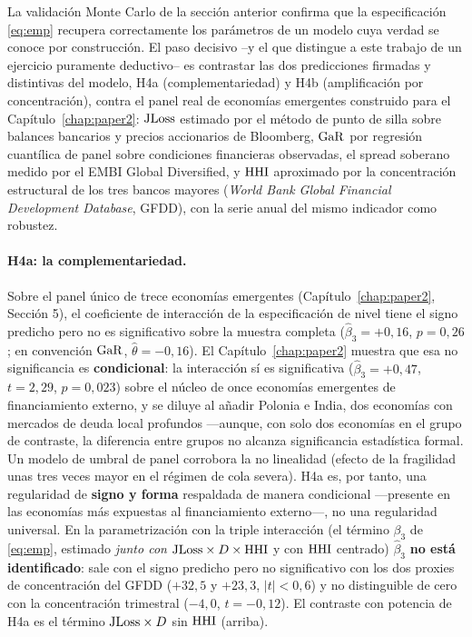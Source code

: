 La validación Monte Carlo de la sección anterior confirma que la especificación \eqref{eq:emp} recupera correctamente los parámetros de un modelo cuya verdad se conoce por construcción. El paso decisivo --y el que distingue a este trabajo de un ejercicio puramente deductivo-- es contrastar las dos predicciones firmadas y distintivas del modelo, H4a (complementariedad) y H4b (amplificación por concentración), contra el panel real de economías emergentes construido para el Capítulo~\ref{chap:paper2}: $\mathrm{JLoss}$ estimado por el método de punto de silla sobre balances bancarios y precios accionarios de Bloomberg, $\mathrm{GaR}$ por regresión cuantílica de panel sobre condiciones financieras observadas, el spread soberano medido por el EMBI Global Diversified, y $\mathrm{HHI}$ aproximado por la concentración estructural de los tres bancos mayores (\textit{World Bank Global Financial Development Database}, GFDD), con la serie anual del mismo indicador como robustez.

\paragraph{H4a: la complementariedad.} Sobre el panel único de trece economías emergentes (Capítulo~\ref{chap:paper2}, Sección 5), el coeficiente de interacción de la especificación de nivel tiene el signo predicho pero no es significativo sobre la muestra completa ($\hat\beta_3=+0{,}16$, $p=0{,}26$; en convención $\mathrm{GaR}$, $\hat\theta=-0{,}16$). El Capítulo~\ref{chap:paper2} muestra que esa no significancia es \textbf{condicional}: la interacción sí es significativa ($\hat\beta_3=+0{,}47$, $t=2{,}29$, $p=0{,}023$) sobre el núcleo de once economías emergentes de financiamiento externo, y se diluye al añadir Polonia e India, dos economías con mercados de deuda local profundos —aunque, con solo dos economías en el grupo de contraste, la diferencia entre grupos no alcanza significancia estadística formal. Un modelo de umbral de panel corrobora la no linealidad (efecto de la fragilidad unas tres veces mayor en el régimen de cola severa). H4a es, por tanto, una regularidad de \textbf{signo y forma} respaldada de manera condicional —presente en las economías más expuestas al financiamiento externo—, no una regularidad universal. En la parametrización con la triple interacción (el término $\beta_3$ de \eqref{eq:emp}, estimado \emph{junto con} $\mathrm{JLoss}\times D\times\mathrm{HHI}$ y con $\mathrm{HHI}$ centrado) $\hat\beta_3$ \textbf{no está identificado}: sale con el signo predicho pero no significativo con los dos proxies de concentración del GFDD ($+32{,}5$ y $+23{,}3$, $|t|<0{,}6$) y no distinguible de cero con la concentración trimestral ($-4{,}0$, $t=-0{,}12$). El contraste con potencia de H4a es el término $\mathrm{JLoss}\times D$ sin $\mathrm{HHI}$ (arriba).

